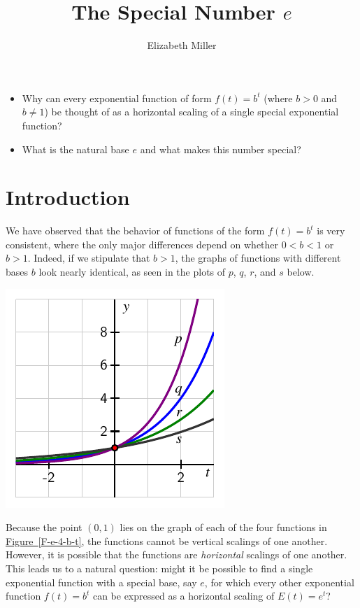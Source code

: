 \documentclass[nooutcomes]{ximera}
\author{Elizabeth Miller}
\title{The Special Number $e$}
\begin{document}
\begin{abstract}
  
\end{abstract}
\maketitle



\begin{motivatingQuestions}\begin{itemize}
\item Why can every exponential function of form $f(t) = b^t$ (where $b \gt 0$ and $b \ne 1$) be thought of as a horizontal scaling of a single special exponential function?
\item What is the natural base $e$ and what makes this number special?
\end{itemize}\end{motivatingQuestions}



\section{Introduction}
We have observed that the behavior of functions of the form $f(t) = b^t$ is very consistent, where the only major differences depend on whether $0< b < 1$ or $b > 1$.  Indeed, if we stipulate that $b \gt 1$, the graphs of functions with different bases $b$ look nearly identical, as seen in the plots of $p$, $q$, $r$, and $s$ below.

\begin{image}
\includegraphics{e-base-compression}
\end{image}
Because the point $(0,1)$ lies on the graph of each of the four functions in \hyperref[F-e-4-b-t]{Figure~\ref{F-e-4-b-t}}, the functions cannot be vertical scalings of one another.  However, it is possible that the functions are \emph{horizontal} scalings of one another.  This leads us to a natural question:  might it be possible to find a single exponential function with a special base, say $e$, for which every other exponential function $f(t) = b^t$ can be expressed as a horizontal scaling of $E(t) = e^t$?
\end{document}
